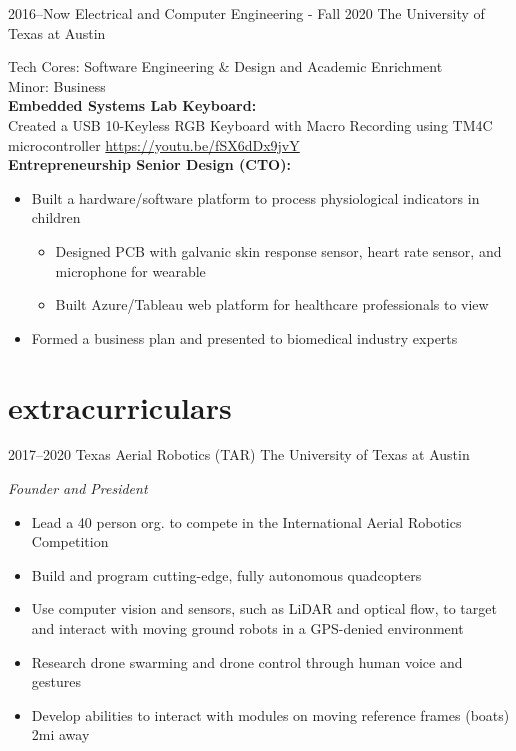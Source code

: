 \documentclass[print]{friggeri-cv} %
\begin{document}
\begin{entrylist}

	\entry
	{2016--Now}
	{Electrical and Computer Engineering - Fall 2020}
	{The University of Texas at Austin}
	{
		Tech Cores: Software Engineering \& Design and Academic Enrichment \\ 
		Minor: Business \\
		\textbf{Embedded Systems Lab Keyboard:} \\ 
			Created a USB 10-Keyless RGB Keyboard with Macro Recording using TM4C microcontroller \href{https://youtu.be/fSX6dDx9jvY}{https://youtu.be/fSX6dDx9jvY} \\
		\textbf{Entrepreneurship Senior Design (CTO):} 
		\begin{itemize}
			\item Built a hardware/software platform to process physiological indicators in children
			\begin{itemize}
				\item Designed PCB with galvanic skin response sensor, heart rate sensor, and microphone for wearable
				\item Built Azure/Tableau web platform for healthcare professionals to view
			\end{itemize}
			\item Formed a business plan and presented to biomedical industry experts 
		\end{itemize}
	}
	
\end{entrylist}

\vspace{-15pt}
\section{extracurriculars}
\vspace{-10pt}

\begin{entrylist}

	\entry
	{2017--2020}
	{Texas Aerial Robotics (TAR)}
	{The University of Texas at Austin}
	{
	\emph{Founder and President}
		\begin{itemize}
			\item Lead a 40 person org. to compete in the International Aerial Robotics Competition
			\item Build and program cutting-edge, fully autonomous quadcopters
			\item Use computer vision and sensors, such as LiDAR and optical flow, to target and interact with moving ground robots in a GPS-denied environment
			\item Research drone swarming and drone control through human voice and gestures
			\item Develop abilities to interact with modules on moving reference frames (boats) 2mi away
		\end{itemize}
	}

\end{entrylist}
\end{document}
